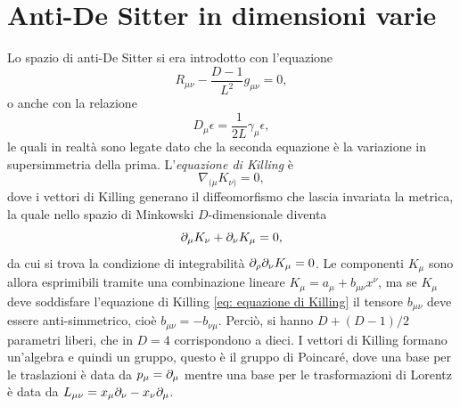\section{Anti-De Sitter in dimensioni varie}
Lo spazio di anti-De Sitter si era introdotto con l'equazione
\begin{equation}
    R_{\mu\nu}  - \frac{D - 1}{L^2}g_{\mu\nu} = 0,
\end{equation}
o anche con la relazione
\begin{equation}
    D_\mu\epsilon = \frac{1}{2L}\gamma_\mu\epsilon,
\end{equation}
le quali in realtà sono legate dato che la seconda equazione è la variazione in supersimmetria della prima. L'\emph{equazione di Killing} è 
\begin{equation}
\label{eq: equazione di Killing}
    \nabla_{(\mu}K_{\nu)} = 0,
\end{equation}
dove i vettori di Killing generano il diffeomorfismo che lascia invariata la metrica, la quale nello spazio di Minkowski $D$-dimensionale diventa 
\begin{equation}
    \partial_\mu K_\nu + \partial_\nu K_\mu = 0,
\end{equation}
da cui si trova la condizione di integrabilità $\partial_\rho\partial_\nu K_\mu = 0$. Le componenti $K_\mu$ sono allora esprimibili tramite una combinazione lineare $K_\mu = a_\mu + b_{\mu\nu}x^\nu$, ma se $K_\mu$ deve soddisfare l'equazione di Killing \eqref{eq: equazione di Killing} il tensore $b_{\mu\nu}$ deve essere anti-simmetrico, cioè $b_{\mu\nu} = -b_{\nu\mu}$. Perciò, si hanno $D + (D - 1)/2$ parametri liberi, che in $D = 4$ corrispondono a dieci. I vettori di Killing formano un'algebra e quindi un gruppo, questo è il gruppo di Poincaré, dove una base per le traslazioni è data da $p_\mu = \partial_\mu$ mentre una base per le trasformazioni di Lorentz è data da $L_{\mu\nu} = x_\mu\partial_\nu - x_\nu\partial_\mu$.

